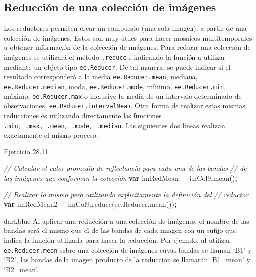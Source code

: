 \documentclass[
  12pt,
  letterpaper,
  twoside]{book}
\newenvironment{Shaded}{\begin{snugshade}}{\end{snugshade}}
\newcommand{\AttributeTok}[1]{\textcolor[rgb]{0.77,0.63,0.00}{#1}}
\newcommand{\CommentTok}[1]{\textcolor[rgb]{0.56,0.35,0.01}{\textit{#1}}}
\newcommand{\FunctionTok}[1]{\textcolor[rgb]{0.00,0.00,0.00}{#1}}
\newcommand{\KeywordTok}[1]{\textcolor[rgb]{0.13,0.29,0.53}{\textbf{#1}}}
\newcommand{\NormalTok}[1]{#1}
\newcommand{\OperatorTok}[1]{\textcolor[rgb]{0.81,0.36,0.00}{\textbf{#1}}}
\begin{document}
\hypertarget{reducciuxf3n-de-una-colecciuxf3n-de-imuxe1genes}{%
\subsection{Reducción de una colección de imágenes}\label{reducciuxf3n-de-una-colecciuxf3n-de-imuxe1genes}}

Los reductores permiten crear un compuesto (una sola imagen), a partir de una colección de imágenes. Estos son muy útiles para hacer mosaicos multitemporales u obtener información de la colección de imágenes. Para reducir una colección de imágenes se utilizará el método \texttt{.reduce} e indicando la función a utilizar mediante un objeto tipo \texttt{ee.Reducer}. De tal manera, se puede indicar si el resultado corresponderá a la media \texttt{ee.Reducer.mean}, mediana, \texttt{ee.Reducer.median}, moda, \texttt{ee.Reducer.mode}, mínimo, \texttt{ee.Reducer.min}, máximo, \texttt{ee.Reducer.max} o inclusive la media de un intervalo determinado de observaciones, \texttt{ee.Reducer.intervalMean}. Otra forma de realizar estas mismas reducciones es utilizando directamente las funciones \texttt{.min,\ .max,\ .mean,\ .mode,\ .median}. Las siguientes dos líneas realizan exactamente el mismo proceso:

Ejercicio 28.11

\begin{Shaded}
\begin{Highlighting}[]
\CommentTok{// Calcular el valor promedio de reflectancia para cada una de las bandas }
\CommentTok{// de las imágenes que conforman la colección}
\KeywordTok{var}\NormalTok{ imRedMean }\OperatorTok{=}\NormalTok{ imCol9}\OperatorTok{.}\FunctionTok{mean}\NormalTok{()}\OperatorTok{;}

\CommentTok{// Realizar lo mismo pero utilizando explicitamente la definición del }
\CommentTok{// reductor}
\KeywordTok{var}\NormalTok{ imRedMean2 }\OperatorTok{=}\NormalTok{ imCol9}\OperatorTok{.}\FunctionTok{reduce}\NormalTok{(ee}\OperatorTok{.}\AttributeTok{Reducer}\OperatorTok{.}\FunctionTok{mean}\NormalTok{())}\OperatorTok{;}
\end{Highlighting}
\end{Shaded}

\begin{bluebox2}

\begin{awesomeblock}{5pt}{\faLightbulb}{darkblue}
Al aplicar una reducción a una colección de imágenes, el nombre de las bandas será el mismo que el de las bandas de cada imagen con un sufijo que indica la función utilizada para hacer la reducción. Por ejemplo, al utilizar \texttt{ee.Reducer.mean} sobre una colección de imágenes cuyas bandas se llaman `B1' y `B2', las bandas de la imagen producto de la reducción se llamarán `B1\_mean' y `B2\_mean'.

\end{awesomeblock}

\end{bluebox2}
\end{document}
